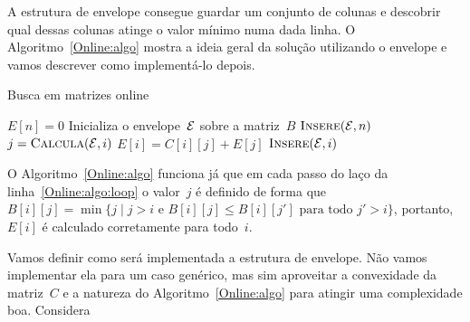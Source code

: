 A estrutura de envelope consegue guardar um conjunto de colunas e descobrir qual dessas colunas atinge o valor mínimo numa dada linha. O Algoritmo~\ref{Online:algo} mostra a ideia geral da solução utilizando o envelope e vamos descrever como implementá-lo depois.

\begin{algorithm}[h]
\caption{Busca em matrizes online}
\label{Online:algo}
\begin{algorithmic}[1]
    \State $E[n] = 0$
	\State Inicializa o envelope~$\mathcal{E}$ sobre a matriz~$B$
    \State $\textsc{Insere}(\mathcal{E},n)$
     \label{Online:algo:loop}
        \State $j = \textsc{Calcula}(\mathcal{E},i)$
        \State $E[i] = C[i][j] + E[j]$
        \State $\textsc{Insere}(\mathcal{E},i)$
    \EndFor
\EndFunction
\end{algorithmic}
\end{algorithm}

O Algoritmo~\ref{Online:algo} funciona já que em cada passo do laço da linha~\ref{Online:algo:loop} o valor~$j$ é definido de forma que~${B[i][j] = \min\{j \mid j > i \text{ e } B[i][j] \leq B[i][j'] \text{ para todo } j' > i\}}$, portanto,~$E[i]$ é calculado corretamente para todo~$i$.

Vamos definir como será implementada a estrutura de envelope. Não vamos implementar ela para um caso genérico, mas sim aproveitar a convexidade da matriz~$C$ e a natureza do Algoritmo~\ref{Online:algo} para atingir uma complexidade boa. Considera
